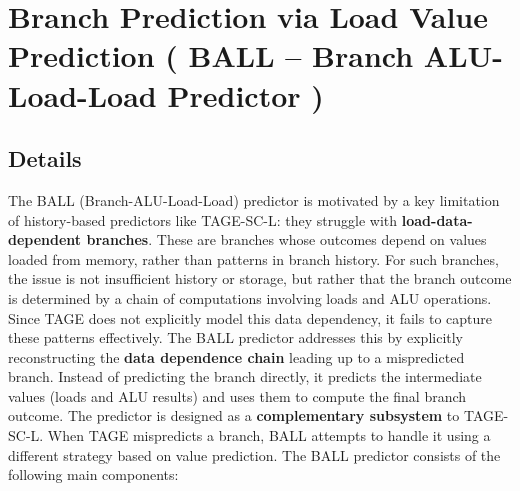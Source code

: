 \documentclass[11pt,a4paper]{article}
\begin{document}
\section{Branch Prediction via Load Value Prediction ( BALL -- Branch ALU-Load-Load Predictor )}

\subsection{Details}
The BALL (Branch-ALU-Load-Load) predictor is motivated by a key limitation of history-based predictors like TAGE-SC-L: they struggle with \textbf{load-data-dependent branches}. These are branches whose outcomes depend on values loaded from memory, rather than patterns in branch history.
For such branches, the issue is not insufficient history or storage, but rather that the branch outcome is determined by a chain of computations involving loads and ALU operations. Since TAGE does not explicitly model this data dependency, it fails to capture these patterns effectively.
The BALL predictor addresses this by explicitly reconstructing the \textbf{data dependence chain} leading up to a mispredicted branch. Instead of predicting the branch directly, it predicts the intermediate values (loads and ALU results) and uses them to compute the final branch outcome.
The predictor is designed as a \textbf{complementary subsystem} to TAGE-SC-L. When TAGE mispredicts a branch, BALL attempts to handle it using a different strategy based on value prediction.
The BALL predictor consists of the following main components:
\end{document}
